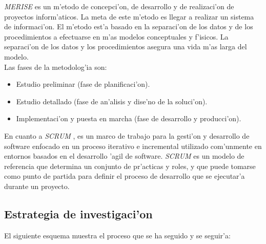\emph{MERISE} es un m'etodo de concepci'on, de desarrollo y de realizaci'on de proyectos inform'aticos. La meta de este m'etodo es llegar a realizar un sistema de informaci'on. El m'etodo est'a basado en la separaci'on de los datos y de los procedimientos a efectuarse en m'as modelos conceptuales y f'isicos. La separaci'on de los datos y los procedimientos asegura una vida m'as larga del modelo.\\

Las fases de la metodolog'ia son:
\begin{itemize}
\item Estudio preliminar (fase de planificaci'on).

\item Estudio detallado (fase de an'alisis y dise'no de la soluci'on).

\item Implementaci'on y puesta en marcha (fase de desarrollo y producci'on).
\end{itemize}

En cuanto a \emph{SCRUM} \cite{Ambler2008}, es un marco de trabajo para la gesti'on y desarrollo de software enfocado en un proceso iterativo e incremental utilizado com'unmente en entornos basados en el desarrollo 'agil de software.  \emph{SCRUM} es un modelo de referencia que determina un conjunto de pr'acticas y roles, y que puede tomarse como punto de partida para definir el proceso de desarrollo que se ejecutar'a durante un proyecto.

\subsection{Estrategia de investigaci'on}
\noindent
El siguiente esquema muestra el proceso que se ha seguido y se seguir'a:

